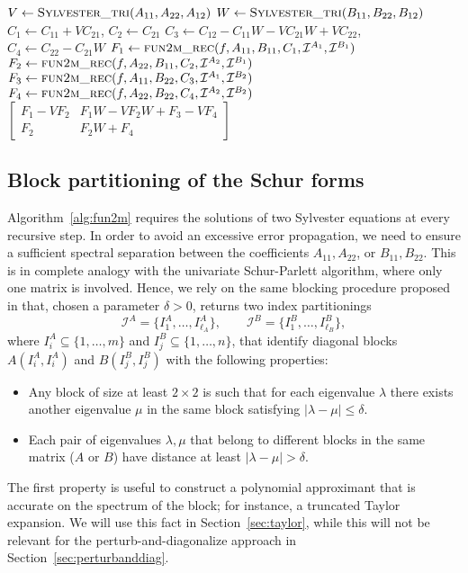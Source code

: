 \documentclass{siamart1116}
\begin{document}
\begin{algorithm}
\begin{algorithmic}[1]
\[\]
\State $V\gets \Call{Sylvester\_tri}{A_{11},A_{22},A_{12}}$
\State $W\gets \Call{Sylvester\_tri}{B_{11},B_{22},B_{12}}$
\State $C_1\gets C_{11}+VC_{21}$, $C_2\gets C_{21}$ \State $C_3\gets C_{12}-C_{11}W-VC_{21}W+VC_{22}$, $C_4\gets C_{22}-C_{21}W$
\State $F_1\gets \Call{fun2m\_rec}{f, A_{11},B_{11}, C_1,\mathcal I^{A_1}, \mathcal I^{B_1}}$
\State $F_2\gets \Call{fun2m\_rec}{f, A_{22},B_{11}, C_2, \mathcal I^{A_2},\mathcal I^{B_1}}$
\State $F_3\gets \Call{fun2m\_rec}{f, A_{11},B_{22}, C_3,\mathcal I^{A_1}, \mathcal I^{B_2}}$
\State $F_4\gets \Call{fun2m\_rec}{f, A_{22},B_{22}, C_4, \mathcal I^{A_2},\mathcal I^{B_2}}$
\State \Return $\begin{bmatrix}
F_1-VF_2& F_1W- VF_2W+F_3-VF_4  \\ F_2& F_2W+F_4
\end{bmatrix}$
\EndIf
\EndProcedure
\end{algorithmic}
\end{algorithm} 


\subsection{Block partitioning of the Schur forms}  \label{sec:blocking}

Algorithm~\ref{alg:fun2m} requires the solutions of two Sylvester equations 
at every recursive step. In order to avoid an excessive error propagation, 
we need to ensure a sufficient spectral separation between the 
coefficients $A_{11}, A_{22}$, or $B_{11}, B_{22}$. This is in complete
analogy with the univariate Schur-Parlett algorithm, where only 
one matrix is involved. Hence, we rely on the same blocking procedure 
proposed in \cite[Algorithm~4.1]{davies2003schur} that, chosen a parameter $\delta > 0$, returns two index partitionings 
\[
    \mathcal I^A = \{ I^A_1, \ldots, I_{\ell_A}^A \}, \qquad 
    \mathcal I^B = \{ I^B_1, \ldots, I_{\ell_B}^B \}, 
\]
where $I^A_i \subseteq \{ 1, \ldots, m \}$ and 
$I^B_j \subseteq \{ 1, \ldots, n \}$, that 
identify diagonal blocks $A(I_i^A, I_i^A)$ and 
$B(I_j^B, I_j^B)$ with the following properties:
\begin{itemize}
    \item Any block of size at least $2 \times 2$
      is such that for 
      each eigenvalue $\lambda$ there exists another eigenvalue
      $\mu$ in the same block satisfying $|\lambda - \mu| \leq \delta$.
    \item Each pair of eigenvalues $\lambda, \mu$ that belong to different blocks in the same matrix ($A$ or $B$)
      have distance at least $|\lambda - \mu| > \delta$. 
\end{itemize}
The first property is useful to construct a polynomial approximant that 
is accurate on the spectrum of the block; for instance, a truncated Taylor
expansion. We will use this fact in Section~\ref{sec:taylor}, while this 
will not be relevant for the perturb-and-diagonalize approach in Section~\ref{sec:perturbanddiag}. 
\end{document}

